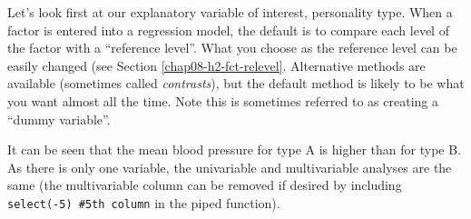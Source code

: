 \documentclass[
  12pt,
  krantz2]{krantz}
\begin{document}

\begin{table}[!h]

\caption{\label{tab:unnamed-chunk-26}Linear regression: Systolic blood pressure by personality type.}
\centering
{}
\end{table}

\begin{table}[!h]

\caption{\label{tab:unnamed-chunk-26}Model metrics: Systolic blood pressure by personality type.}
\centering
{}
\end{table}

Let's look first at our explanatory variable of interest, personality type.
When a factor is entered into a regression model, the default is to compare each level of the factor with a ``reference level''.
What you choose as the reference level can be easily changed (see Section \ref{chap08-h2-fct-relevel}.
Alternative methods are available (sometimes called \emph{contrasts}), but the default method is likely to be what you want almost all the time.
Note this is sometimes referred to as creating a ``dummy variable''.

It can be seen that the mean blood pressure for type A is higher than for type B.
As there is only one variable, the univariable and multivariable analyses are the same (the multivariable column can be removed if desired by including \texttt{select(-5)\ \#5th\ column} in the piped function).
\end{document}
